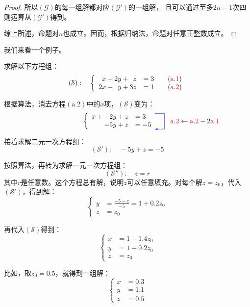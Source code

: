 \documentclass[12pt,UTF8]{ctexbook}
\begin{document}
\begin{proof}
    所以$(\mathcal{G})$的每一组解都对应$(\mathcal{G}')$的一组解，
    且可以通过至多$2n-1$次四则运算从$(\mathcal{G}')$得到。

    综上所述，命题对$n$也成立。因而，根据归纳法，命题对任意正整数成立。

\end{proof}

我们来看一个例子。

\begin{et}
    求解以下方程组：
    $$ (\mathcal{S}):\quad \left\{
        \begin{array}{rl}
    x + 2y + \phantom{0}z &= 3 \quad \quad ({\color{red}\mathrm{a}.1})\\
    2x - \phantom{0}y + 3z &= 1  \quad \quad ({\color{red}\mathrm{a}.2})
    \end{array}
    \right. $$    
\end{et}

\begin{so}
根据算法，消去方程$(\mathrm{a}.2)$中的$x$项，$(\mathcal{S})$变为：
$$ \qquad \qquad \qquad \qquad\qquad \left\{
    \begin{array}{rl}
x + \phantom{-}2y + z &= 3 \\
 - 5y + z &= -5  
\end{array}
\begin{tikzpicture}[baseline={([yshift=-.5ex]current bounding box.center)},>=latex]
    \draw[color=blue, ->] (.5,.4)--(1.0, .4)--(1.0,-.4)--(.5, -.4);
    \node[text width=3.4cm] at (3, 0.0) {${{\color{red}\mathrm{a}.2} \leftarrow {\color{red}\mathrm{a}.2} - 2\color{red}\mathrm{a}.1}$};
  \end{tikzpicture}
\right. $$

接着求解二元一次方程组：
$$ (\mathcal{S}'):\quad  - 5y + z = -5 $$

按照算法，再转为求解一元一次方程组：
$$ (\mathcal{S}''):\quad  z = r $$
其中$r$是任意数。这个方程总有解，说明$z$可以任意填充。对每个解$z = z_0$，代入$(\mathcal{S}')$，得到解：
$$ \left\{
    \begin{array}{rl}
        y &=\frac{-5 - z}{-5} = 1 + 0.2 z_0 \\
        z &= z_0 
    \end{array}
\right. $$

再代入$(\mathcal{S})$得到：
$$ \left\{
    \begin{array}{rl}
        x &= 1 - 1.4 z_0 \\
        y &= 1 + 0.2 z_0\\
        z &= z_0
    \end{array}
\right. $$

比如，取$z_0 = 0.5$，就得到一组解：
$$ \left\{
    \begin{array}{rl}
        x &= 0.3  \\
        y &= 1.1 \\
        z &= 0.5 
    \end{array}
\right. $$
    
\end{so}
\end{document}
